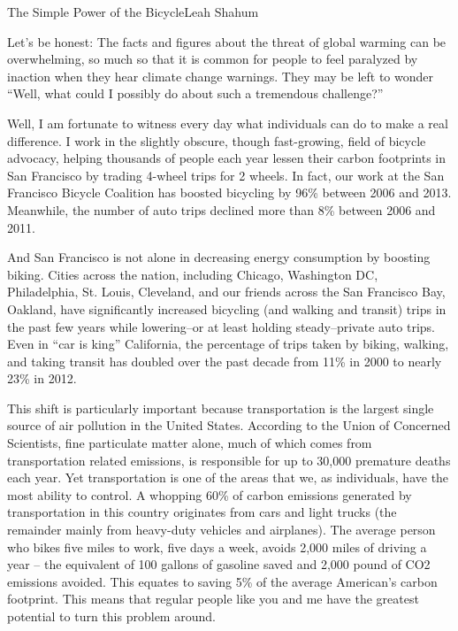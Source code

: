 \documentclass{papertex}
\begin{document}
\begin{news}{2}{The Simple Power of the Bicycle}{Leah Shahum}{}{}

Let's be honest: The facts and figures about the threat of global warming can be overwhelming, so much so that it is common for people to feel paralyzed by inaction when they hear climate change warnings. They may be left to wonder “Well, what could I possibly do about such a tremendous challenge?”

Well, I am fortunate to witness every day what individuals can do to make a real difference. I work in the slightly obscure, though fast-growing, field of bicycle advocacy, helping thousands of people each year lessen their carbon footprints in San Francisco by trading 4-wheel trips for 2 wheels. In fact, our work at the San Francisco Bicycle Coalition has boosted bicycling by 96\% between 2006 and 2013. Meanwhile, the number of auto trips declined more than 8\% between 2006 and 2011.

And San Francisco is not alone in decreasing energy consumption by boosting biking. Cities across the nation, including Chicago, Washington DC, Philadelphia, St. Louis, Cleveland, and our friends across the San Francisco Bay, Oakland, have significantly increased bicycling (and walking and transit) trips in the past few years while lowering–or at least holding steady–private auto trips. Even in “car is king” California, the percentage of trips taken by biking, walking, and taking transit has doubled over the past decade from 11\% in 2000 to nearly 23\% in 2012.

This shift is particularly important because transportation is the largest single source of air pollution in the United States. According to the Union of Concerned Scientists, fine particulate matter alone, much of which comes from transportation related emissions, is responsible for up to 30,000 premature deaths each year. Yet transportation is one of the areas that we, as individuals, have the most ability to control. A whopping 60\% of carbon emissions generated by transportation in this country originates from cars and light trucks (the remainder mainly from heavy-duty vehicles and airplanes). The average person who bikes five miles to work, five days a week, avoids 2,000 miles of driving a year – the equivalent of 100 gallons of gasoline saved and 2,000 pound of CO2 emissions avoided. This equates to saving 5\% of the average American’s carbon footprint. This means that regular people like you and me have the greatest potential to turn this problem around.


\end{news}
\end{document}
